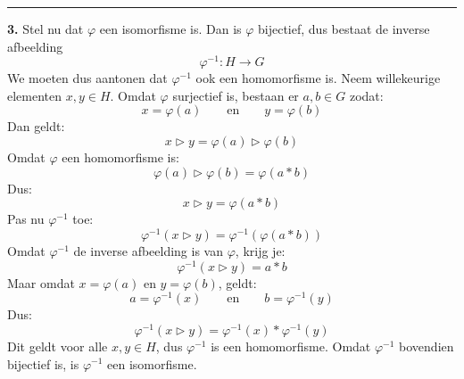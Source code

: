 \hrule
\textbf{3.} Stel nu dat $\varphi$ een isomorfisme is. Dan is $\varphi$ bijectief, dus bestaat de inverse afbeelding
\begin{equation*}
    \varphi^{-1} : H \to G
\end{equation*}
We moeten dus aantonen dat $\varphi^{-1}$ ook een homomorfisme is. Neem willekeurige elementen $x,y \in H$. Omdat $\varphi$ surjectief is, bestaan er $a,b \in G$ zodat:
\begin{equation*}
    x = \varphi(a) \qquad \text{en} \qquad y = \varphi(b)
\end{equation*}
Dan geldt:
\begin{equation*}
    x \triangleright y = \varphi(a) \triangleright \varphi(b)
\end{equation*}
Omdat $\varphi$ een homomorfisme is:
\begin{equation*}
    \varphi(a) \triangleright \varphi(b) = \varphi(a*b)
\end{equation*}
Dus:
\begin{equation*}
    x \triangleright y = \varphi(a * b)
\end{equation*}
Pas nu $\varphi^{-1}$ toe:
\begin{equation*}
    \varphi^{-1}(x \triangleright y) = \varphi^{-1}(\varphi(a * b))
\end{equation*}
Omdat $\varphi^{-1}$ de inverse afbeelding is van $\varphi$, krijg je:
\begin{equation*}
    \varphi^{-1}(x \triangleright y) = a * b
\end{equation*}
Maar omdat $x = \varphi(a)$ en $y = \varphi(b)$, geldt:
\begin{equation*}
    a = \varphi^{-1}(x) \qquad \text{en} \qquad b = \varphi^{-1}(y)
\end{equation*}
Dus:
\begin{equation*}
    \varphi^{-1}(x \triangleright y) = \varphi^{-1}(x) * \varphi^{-1}(y)
\end{equation*}
Dit geldt voor alle $x,y\in H$, dus $\varphi^{-1}$ is een homomorfisme. Omdat $\varphi^{-1}$ bovendien bijectief is, is $\varphi^{-1}$ een isomorfisme.

